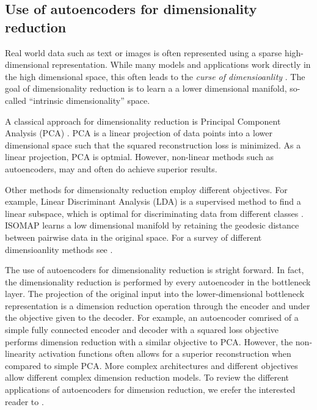 \documentclass[graybox]{svmult}
\begin{document}
\subsection{Use of autoencoders for dimensionality reduction}
Real world data such as text or images is often represented using a sparse high-dimensional representation. While many models and applications work directly in the high dimensional space, this often leads to the \emph{curse of dimensioanlity} \cite{Curse_of_dim}. The goal of dimensionality reduction is to learn a a lower dimensional manifold, so-called ``intrinsic dimensionality'' space. 

A classical approach for dimensionality reduction is Principal Component Analysis (PCA) \cite{PCA}. PCA is a linear projection of data points into a lower dimensional space such that the squared reconstruction loss is minimized. As a linear projection, PCA is optmial. However, non-linear methods such as autoencoders, may and often do achieve superior results. 

Other methods for dimensionalty reduction employ different objectives. For example, Linear Discriminant Analysis (LDA) is a supervised method to find a linear subspace, which is optimal for discriminating data from different classes \cite{duda2001pattern}. ISOMAP \cite{ISOMAP} learns a low dimensional manifold by retaining the geodesic distance between pairwise data in the original space. For a survey of different dimensioanlity methods see \cite{dimensionality_reduction}. 

The use of autoencoders for dimensionality reduction is stright forward. In fact, the dimensionality reduction is performed by every autoencoder in the bottleneck layer. The projection of the original input into the lower-dimensional bottleneck representation is a dimension reduction operation through the encoder and under the objective given to the decoder. For example, an autoencoder comrised of a simple fully connected encoder and decoder with a squared loss objective performs dimension reduction with a similar objective to PCA. However, the non-linearity activation functions often allows for a superior reconstruction when compared to simple PCA. More complex architectures and different objectives allow different complex dimension reduction models.  
To review the different applications of autoencoders for dimension reduction, we erefer the interested reader to \cite{hinton2006reducing,wang2014generalized,wang2016auto}. 
\end{document}
